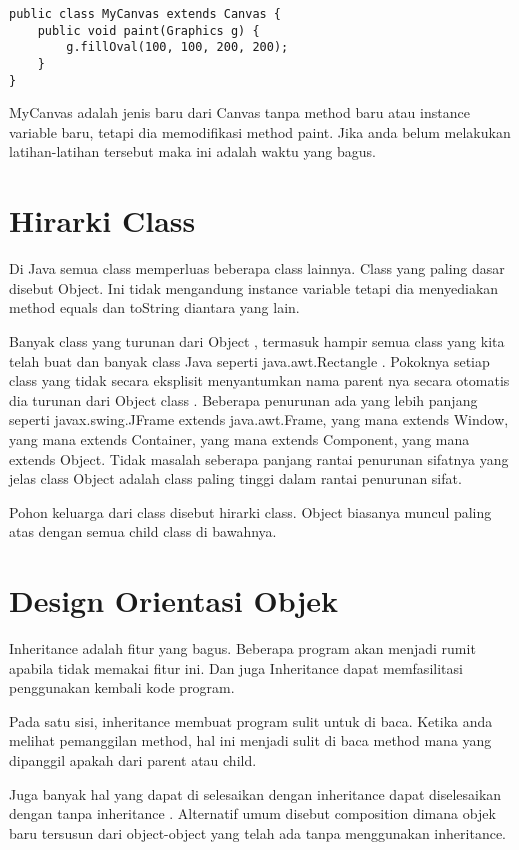 \begin{lstlisting}
public class MyCanvas extends Canvas {
	public void paint(Graphics g) {
		g.fillOval(100, 100, 200, 200);
	}
}
\end{lstlisting}

MyCanvas adalah jenis baru dari Canvas tanpa method baru atau instance variable baru, tetapi dia memodifikasi method paint. Jika anda belum melakukan latihan-latihan tersebut maka ini adalah waktu yang bagus.


\section{Hirarki Class} %

Di Java semua class memperluas beberapa class lainnya. Class yang paling dasar disebut Object. Ini tidak mengandung instance variable tetapi dia menyediakan method equals dan toString diantara yang lain.

Banyak class yang turunan dari Object , termasuk hampir semua class yang kita telah buat dan banyak class Java seperti java.awt.Rectangle . Pokoknya setiap class yang tidak secara eksplisit menyantumkan nama parent nya secara otomatis dia turunan dari Object class . Beberapa penurunan ada yang lebih panjang seperti javax.swing.JFrame extends java.awt.Frame, yang mana  extends Window, yang mana extends Container, yang mana extends Component, yang mana extends Object. Tidak masalah seberapa panjang rantai penurunan sifatnya yang jelas class Object adalah class paling tinggi dalam rantai penurunan sifat.

Pohon keluarga dari class disebut hirarki class.  Object biasanya muncul paling atas dengan semua child class di bawahnya.

\section{Design Orientasi Objek} %

Inheritance adalah fitur yang bagus. Beberapa program akan menjadi rumit apabila tidak memakai fitur ini. Dan juga Inheritance dapat memfasilitasi penggunakan kembali kode program.

Pada satu sisi, inheritance membuat program sulit untuk di baca. Ketika anda melihat pemanggilan method, hal ini menjadi sulit di baca method mana yang dipanggil apakah dari parent atau child.

Juga banyak hal yang dapat di selesaikan dengan inheritance dapat diselesaikan dengan tanpa inheritance . Alternatif umum disebut composition dimana objek baru tersusun dari object-object yang telah ada tanpa menggunakan inheritance. 

